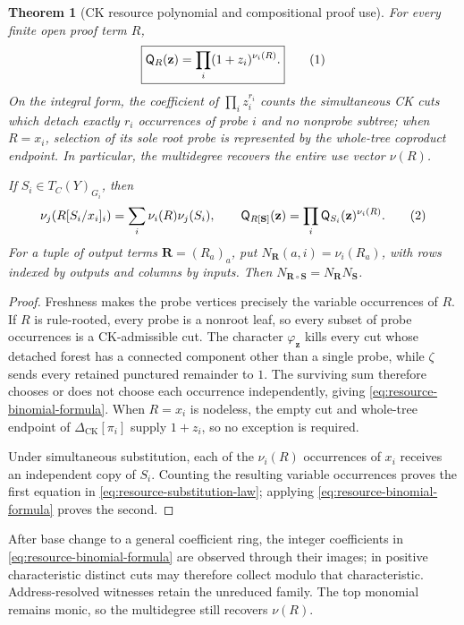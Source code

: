 \documentclass[10pt,a4paper]{article}
\theoremstyle{plain}
\newtheorem{theorem}{Theorem}[section]
\theoremstyle{definition}
\theoremstyle{remark}
\newcommand{\DeltaCK}{\Delta_{\mathrm{CK}}}
\newcommand{\eqtag}{\refstepcounter{equation}\tag{\theequation}}
\begin{document}
\begin{theorem}[CK resource polynomial and compositional proof use]
\label{thm:ck-resource-polynomial}
For every finite open proof term \(R\),
\[
 \boxed{\displaystyle
 \mathsf Q_R(\mathbf z)
    =\prod_{i}(1+z_i)^{\nu_i(R)}.}
\eqtag\label{eq:resource-binomial-formula}
\]
On the integral form, the coefficient of
\(\prod_i z_i^{r_i}\) counts the simultaneous CK cuts which detach exactly
\(r_i\) occurrences of probe \(i\) and no nonprobe subtree; when \(R=x_i\),
selection of its sole root probe is represented by the whole-tree coproduct
endpoint.  In particular,
the multidegree recovers the entire use vector \(\nu(R)\).

If \(S_i\in T_C(Y)_{G_i}\), then
\[
 \nu_j\!\left(R[S_i/x_i]_i\right)
     =\sum_i\nu_i(R)\nu_j(S_i),
 \qquad
 \mathsf Q_{R[\mathbf S]}(\mathbf z)
     =\prod_i\mathsf Q_{S_i}(\mathbf z)^{\nu_i(R)}.
\eqtag\label{eq:resource-substitution-law}
\]
For a tuple of output terms \(\mathbf R=(R_a)_a\), put
\(N_{\mathbf R}(a,i)=\nu_i(R_a)\), with rows indexed by outputs and columns
by inputs.  Then
\(N_{\mathbf R\circ\mathbf S}=N_{\mathbf R}N_{\mathbf S}\).
\end{theorem}

\begin{proof}
Freshness makes the probe vertices precisely the variable occurrences of
\(R\).  If \(R\) is rule-rooted, every probe is a nonroot leaf, so every
subset of probe occurrences is a CK-admissible cut.  The character
\(\varphi_{\mathbf z}\) kills every cut whose
detached forest has a connected component other than a single probe, while
\(\zeta\) sends every
retained punctured remainder to \(1\).  The surviving sum therefore chooses
or does not choose each occurrence independently, giving
\eqref{eq:resource-binomial-formula}.  When \(R=x_i\) is nodeless, the empty
cut and whole-tree endpoint of \(\DeltaCK[\pi_i]\) supply \(1+z_i\), so no
exception is required.

Under simultaneous substitution, each of the \(\nu_i(R)\) occurrences of
\(x_i\) receives an independent copy of \(S_i\).  Counting the resulting
variable occurrences proves the first equation in
\eqref{eq:resource-substitution-law}; applying
\eqref{eq:resource-binomial-formula} proves the second.
\end{proof}

After base change to a general coefficient ring, the integer coefficients
in \eqref{eq:resource-binomial-formula} are observed through their images;
in positive characteristic distinct cuts may therefore collect modulo that
characteristic.  Address-resolved witnesses retain the unreduced family.
The top monomial remains monic, so the multidegree still recovers \(\nu(R)\).
\end{document}
